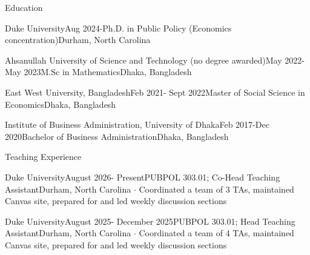 \documentclass[
	9pt %
]{resume} %
\begin{document}

\begin{rSection}{Education}
	\singlespacing %
	\begin{rSubsection}{Duke University}{Aug 2024-}{Ph.D. in Public Policy (Economics concentration)}{Durham, North Carolina}
	\end{rSubsection}
	\begin{rSubsection}{Ahsanullah University of Science and Technology (no degree awarded)}{May 2022-May 2023}{M.Sc in Mathematics}{Dhaka, Bangladesh}
	\end{rSubsection}	

	\begin{rSubsection}{East West University, Bangladesh}{Feb 2021- Sept 2022}{Master of Social Science in Economics}{Dhaka, Bangladesh}
	\end{rSubsection}

	\begin{rSubsection}{Institute of Business Administration, University of Dhaka}{Feb 2017-Dec 2020}{Bachelor of Business Administration}{Dhaka, Bangladesh}
	\end{rSubsection}		
\end{rSection}


\vspace{-10pt}
\begin{rSection}{Teaching Experience}

	\begin{rSubsection}{Duke University}{August 2026- Present}{PUBPOL 303.01; Co-Head Teaching Assistant}{Durham, North Carolina}
		$\cdot$ Coordinated a team of 3 TAs, maintained Canvas site, prepared for and led weekly discussion sections
	\end{rSubsection}

	\begin{rSubsection}{Duke University}{August 2025- December 2025}{PUBPOL 303.01; Head Teaching Assistant}{Durham, North Carolina}
		$\cdot$ Coordinated a team of 4 TAs, maintained Canvas site, prepared for and led weekly discussion sections
	\end{rSubsection}
\end{rSection}
\end{document}
